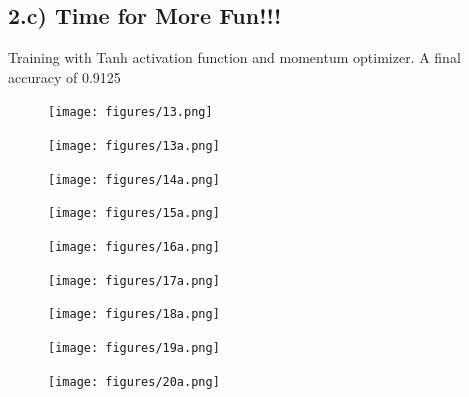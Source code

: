 \documentclass{article}
\begin{document}
\subsection*{2.c) Time for More Fun!!!}
Training with Tanh activation function and momentum optimizer. A final accuracy of 0.9125
	\begin{figure}[H]
		\centering
		\texttt{[image: figures/13.png]}
	\end{figure}
	\begin{figure}[H]
		\centering
		\texttt{[image: figures/13a.png]}
	\end{figure}
	\begin{figure}[H]
		\centering
		\texttt{[image: figures/14a.png]}
	\end{figure}
	\begin{figure}[H]
		\centering
		\texttt{[image: figures/15a.png]}
	\end{figure}
	\begin{figure}[H]
		\centering
		\texttt{[image: figures/16a.png]}
	\end{figure}
	\begin{figure}[H]
		\centering
		\texttt{[image: figures/17a.png]}
	\end{figure}
	\begin{figure}[H]
		\centering
		\texttt{[image: figures/18a.png]}
	\end{figure}
	\begin{figure}[H]
		\centering
		\texttt{[image: figures/19a.png]}
	\end{figure}
	\begin{figure}[H]
		\centering
		\texttt{[image: figures/20a.png]}
	\end{figure}
\end{document}

